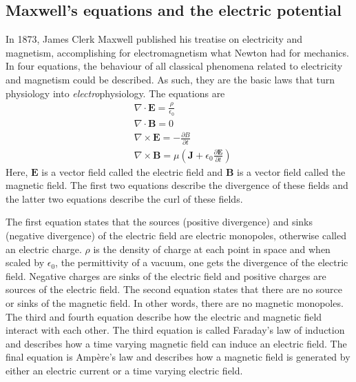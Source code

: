 \subsection{Maxwell's equations and the electric potential}
In 1873, James Clerk Maxwell published his treatise on electricity and magnetism, accomplishing for electromagnetism what Newton had for mechanics. In four equations, the behaviour of all classical phenomena related to electricity and magnetism could be described. As such, they are the basic laws that turn physiology into \textit{electro}physiology. The equations are
\begin{align*}
    & \nabla \cdot \bm{E} = \frac{\rho}{\epsilon_0} \\
    & \nabla \cdot \bm{B} = 0 \\
    & \nabla \times \bm{E} = - \frac{\partial {B}}{\partial t} \\
    & \nabla \times \bm{B} = \mu \left( \bm{J} + \epsilon_0 \frac{\partial \bm{E}}{\partial t} \right)
\end{align*}
Here, $\bm{E}$ is a vector field called the electric field and $\bm{B}$ is a vector field called the magnetic field. The first two equations describe the divergence of these fields and the latter two equations describe the curl of these fields. 

The first equation states that the sources (positive divergence) and sinks (negative divergence) of the electric field are electric monopoles, otherwise called an electric charge. $\rho$ is the density of charge at each point in space and when scaled by $\epsilon_0$, the permittivity of a vacuum, one gets the divergence of the electric field. Negative charges are sinks of the electric field and positive charges are sources of the electric field. The second equation states that there are no source or sinks of the magnetic field. In other words, there are no magnetic monopoles. The third and fourth equation describe how the electric and magnetic field interact with each other. The third equation is called Faraday's law of induction and describes how a time varying magnetic field can induce an electric field. The final equation is Ampère's law and describes how a magnetic field is generated by either an electric current or a time varying electric field.

